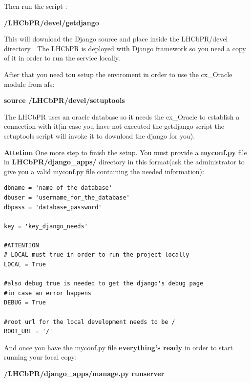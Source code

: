 \documentclass{lhcbnote}
\begin{document}
\vspace{2 mm}

Then run the script :

\vspace{2 mm}


{\bf /LHCbPR/devel/getdjango}

\vspace{2 mm}

This will download the Django source and place inside the LHCbPR/devel directory . 
The LHCbPR is deployed with Django framework so you need a copy of it in order to 
run the service locally.

After that you need tou setup the enviroment in order to use the cx\_Oracle module from afs:

\vspace{2 mm}

{\bf source /LHCbPR/devel/setuptools}

\vspace{2 mm}

The LHCbPR uses an oracle database
so it needs the cx\_Oracle to establish a connection with it(in case you have not executed the getdjango script the setuptools script will invoke it to download the django for you).

{\bf Attetion} One more step to finish the setup. You must provide a {\bf myconf.py}
file in {\bf LHCbPR/django\_apps/} directory in this format(ask the administrator to give you a valid myconf.py file
containing the needed information):

\begin{verbatim}
dbname = 'name_of_the_database'
dbuser = 'username_for_the_database'
dbpass = 'database_password'

key = 'key_django_needs'

#ATTENTION
# LOCAL must true in order to run the project locally
LOCAL = True

#also debug true is needed to get the django's debug page
#in case an error happens
DEBUG = True

#root url for the local development needs to be /
ROOT_URL = '/'
\end{verbatim}

And once you have the myconf.py file {\bf everything's ready} in order to start running your local copy:

\vspace{2 mm}

{\bf /LHCbPR/django\_apps/manage.py runserver}
\end{document}
